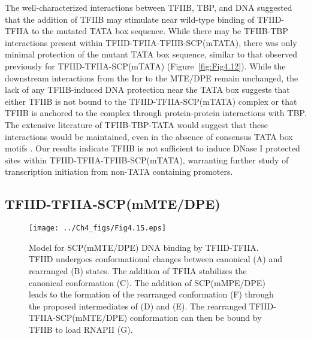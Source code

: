 \indent The well-characterized interactions between TFIIB, TBP, and DNA suggested that the addition of TFIIB may stimulate near wild-type binding of TFIID-TFIIA to the mutated TATA box sequence. While there may be TFIIB-TBP interactions present within TFIID-TFIIA-TFIIB-SCP(mTATA), there was only minimal protection of the mutant TATA box sequence, similar to that observed previously for TFIID-TFIIA-SCP(mTATA) (Figure~\ref{fig:Fig4.12}). While the downstream interactions from the Inr to the MTE/DPE remain unchanged, the lack of any TFIIB-induced DNA protection near the TATA box suggests that either TFIIB is not bound to the TFIID-TFIIA-SCP(mTATA) complex or that TFIIB is anchored to the complex through protein-protein interactions with TBP. The extensive literature of TFIIB-TBP-TATA would suggest that these interactions would be maintained, even in the absence of consensus TATA box motifs \cite{Rhee_24}. Our results indicate TFIIB is not sufficient to induce DNase I protected sites within TFIID-TFIIA-TFIIB-SCP(mTATA), warranting further study of transcription initiation from non-TATA containing promoters.\\

\subsection{TFIID-TFIIA-SCP(mMTE/DPE)} 

\begin{figure}
\centering
\texttt{[image: ../Ch4\_figs/Fig4.15.eps]}
\caption[Model for SCP(mMTE/DPE) DNA binding by TFIID-TFIIA]{Model for SCP(mMTE/DPE) DNA binding by TFIID-TFIIA. TFIID undergoes conformational changes between canonical (A) and rearranged (B) states. The addition of TFIIA stabilizes the canonical conformation (C). The addition of SCP(mMPE/DPE) leads to the formation of the rearranged conformation (F) through the proposed intermediates of (D) and (E). The rearranged TFIID-TFIIA-SCP(mMTE/DPE) conformation can then be bound by TFIIB to load RNAPII (G).}
\label{fig:Fig4.15}
\end{figure}

